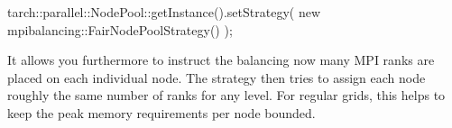 \begin{code}
tarch::parallel::NodePool::getInstance().setStrategy(
  new mpibalancing::FairNodePoolStrategy()
);
\end{code}

\noindent
It allows you furthermore to instruct the balancing now many MPI ranks are
placed on each individual node. 
The strategy then tries to assign each node roughly the same number of ranks for
any level.
For regular grids, this helps to keep the peak memory requirements per node
bounded.

